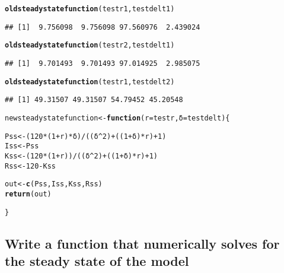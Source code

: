 \documentclass{article}\usepackage[]{graphicx}\usepackage[]{color}
\makeatletter
\newcommand{\hlnum}[1]{\textcolor[rgb]{0.686,0.059,0.569}{#1}}%
\newcommand{\hlopt}[1]{\textcolor[rgb]{0,0,0}{#1}}%
\newcommand{\hlstd}[1]{\textcolor[rgb]{0.345,0.345,0.345}{#1}}%
\newcommand{\hlkwa}[1]{\textcolor[rgb]{0.161,0.373,0.58}{\textbf{#1}}}%
\newcommand{\hlkwb}[1]{\textcolor[rgb]{0.69,0.353,0.396}{#1}}%
\newcommand{\hlkwc}[1]{\textcolor[rgb]{0.333,0.667,0.333}{#1}}%
\newcommand{\hlkwd}[1]{\textcolor[rgb]{0.737,0.353,0.396}{\textbf{#1}}}%
\newenvironment{kframe}{%
 \def\at@end@of@kframe{}%
 \ifinner\ifhmode%
  \def\at@end@of@kframe{\end{minipage}}%
  \begin{minipage}{\columnwidth}%
 \fi\fi%
 \def\FrameCommand##1{\hskip\@totalleftmargin \hskip-\fboxsep
 \colorbox{shadecolor}{##1}\hskip-\fboxsep
     \hskip-\linewidth \hskip-\@totalleftmargin \hskip\columnwidth}%
 \MakeFramed {\advance\hsize-\width
   \@totalleftmargin\z@ \linewidth\hsize
   \@setminipage}}%
 {\par\unskip\endMakeFramed%
 \at@end@of@kframe}
\newenvironment{knitrout}{}{} %
\makeatother
\begin{document}
\begin{knitrout}
\begin{kframe}
\begin{alltt}
\hlkwd{oldsteadystatefunction}\hlstd{(testr1, testdelt1)}
\end{alltt}
\begin{verbatim}
## [1]  9.756098  9.756098 97.560976  2.439024
\end{verbatim}
\begin{alltt}
\hlkwd{oldsteadystatefunction}\hlstd{(testr2, testdelt1)}
\end{alltt}
\begin{verbatim}
## [1]  9.701493  9.701493 97.014925  2.985075
\end{verbatim}
\begin{alltt}
\hlkwd{oldsteadystatefunction}\hlstd{(testr1, testdelt2)}
\end{alltt}
\begin{verbatim}
## [1] 49.31507 49.31507 54.79452 45.20548
\end{verbatim}
\begin{alltt}
\hlstd{newsteadystatefunction} \hlkwb{<-} \hlkwa{function}\hlstd{(}\hlkwc{r} \hlstd{= testr,}\hlkwc{δ} \hlstd{= testdelt)\{}

\hlstd{Pss} \hlkwb{<-} \hlstd{(}\hlnum{120}\hlopt{*}\hlstd{(}\hlnum{1}\hlopt{+}\hlstd{r)}\hlopt{*}\hlstd{δ)} \hlopt{/} \hlstd{((δ}\hlopt{^}\hlnum{2}\hlstd{)} \hlopt{+} \hlstd{((}\hlnum{1}\hlopt{+}\hlstd{δ)}\hlopt{*}\hlstd{r)} \hlopt{+} \hlnum{1}\hlstd{)}
\hlstd{Iss} \hlkwb{<-} \hlstd{Pss}
\hlstd{Kss} \hlkwb{<-} \hlstd{(}\hlnum{120}\hlopt{*}\hlstd{(}\hlnum{1}\hlopt{+}\hlstd{r))} \hlopt{/} \hlstd{((δ}\hlopt{^}\hlnum{2}\hlstd{)} \hlopt{+} \hlstd{((}\hlnum{1}\hlopt{+}\hlstd{δ)}\hlopt{*}\hlstd{r)} \hlopt{+} \hlnum{1}\hlstd{)}
\hlstd{Rss} \hlkwb{<-} \hlnum{120} \hlopt{-} \hlstd{Kss}

\hlstd{out} \hlkwb{<-} \hlkwd{c}\hlstd{(Pss, Iss, Kss, Rss)}
\hlkwd{return}\hlstd{(out)}

\hlstd{\}}
\end{alltt}
\end{kframe}
\end{knitrout}

\subsection{Write a function that numerically solves for the steady state of the model}
\end{document}
